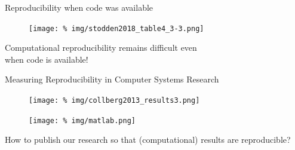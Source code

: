 \begin{frame}{Reproducibility when code was available}

    \begin{figure}
      \centering
      \texttt{[image: \%
      img/stodden2018\_table4\_3-3.png]} %
    \end{figure}

    \vspace{-1.25cm}
  
\begin{center}
      Computational reproducibility remains difficult even \\when code is available!
      
\end{center}
  
    
\end{frame}






\begin{frame}{\large Measuring Reproducibility in Computer Systems Research}

  \begin{figure}
    \centering
    \texttt{[image: \%
      img/collberg2013\_results3.png]} %
  \end{figure}
  


  
  
\end{frame}


\begin{frame}{}
  
  \begin{figure}
    \centering
    \texttt{[image: \%
    img/matlab.png]} %
  \end{figure}

  \begin{center}
  \large How to publish our research so that (computational) results are reproducible?    
  \end{center}
  
\end{frame}



